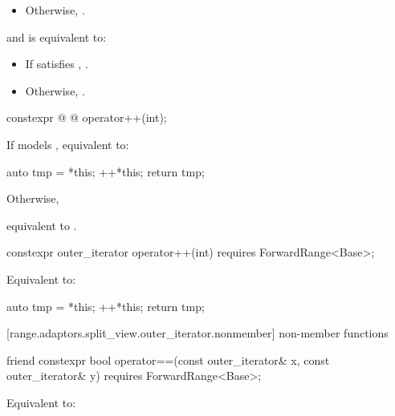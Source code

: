 {{\begin{itemize}
\item Otherwise, .
\end{itemize}

and  is equivalent to:
\begin{itemize}
\item If  satisfies ,
.

\item Otherwise, .
\end{itemize}
} %

%
\begin{itemdecl}
constexpr @ @ operator++(int);
\end{itemdecl}

\begin{itemdescr}
\pnum
\effects
{\color{newclr}
If  models , equivalent to:
\begin{codeblock}
auto tmp = *this;
++*this;
return tmp;
\end{codeblock}
Otherwise,
} %
equivalent to .
\end{itemdescr}

{\color{oldclr}
%
\begin{itemdecl}
constexpr outer_iterator operator++(int) requires ForwardRange<Base>;
\end{itemdecl}

\begin{itemdescr}
\pnum
\effects Equivalent to:
\begin{codeblock}
auto tmp = *this;
++*this;
return tmp;
\end{codeblock}
\end{itemdescr}
} %

[range.adaptors.split_view.outer_iterator.nonmember]{ non-member functions}

%
\begin{itemdecl}
friend constexpr bool operator==(const outer_iterator& x, const outer_iterator& y)
  requires ForwardRange<Base>;
\end{itemdecl}

\begin{itemdescr}
\pnum
\effects Equivalent to: 
\end{itemdescr}

}
